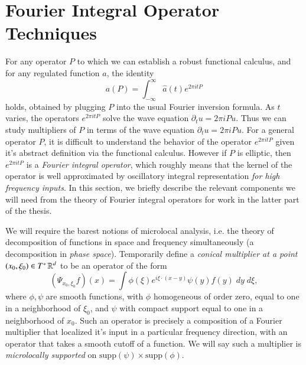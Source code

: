 \section{Fourier Integral Operator Techniques} \label{sec:FourierIntegral}

For any operator $P$ to which we can establish a robust functional calculus, and for any regulated function $a$, the identity
%
\begin{equation}
  a(P) = \int_{-\infty}^\infty \widehat{a}(t) e^{2 \pi itP}
\end{equation}
%
holds, obtained by plugging $P$ into the usual Fourier inversion formula. As $t$ varies, the operators $e^{2 \pi itP}$ solve the wave equation $\partial_t u = 2 \pi i P u$. Thus we can study multipliers of $P$ in terms of the wave equation $\partial_t u = 2 \pi i P u$. For a general operator $P$, it is difficult to understand the behavior of the operator $e^{2 \pi i t P}$ given it's abstract definition via the functional calculus. However if $P$ is elliptic, then $e^{2 \pi i t P}$ is a \emph{Fourier integral operator}, which roughly means that the kernel of the operator is well approximated by oscillatory integral representation \emph{for high frequency inputs}. In this section, we briefly describe the relevant components we will need from the theory of Fourier integral operators for work in the latter part of the thesis.

We will require the barest notions of microlocal analysis, i.e. the theory of decomposition of functions in space and frequency simultaneously (a decomposition in \emph{phase space}). Temporarily define a \emph{conical multiplier at a point $(x_0,\xi_0) \in T^* \operatorname{\mathbb{R}}^d$} to be an operator of the form
%
\begin{equation}
  (\Psi_{x_0,\xi_0} f)(x) = \int \phi( \xi ) e^{i \xi \cdot (x - y)} \psi(y) f(y)\; dy\; d\xi,
\end{equation}
%
where $\phi,\psi$ are smooth functions, with $\phi$ homogeneous of order zero, equal to one in a neighborhood of $\xi_0$, and $\psi$ with compact support equal to one in a neighborhood of $x_0$. Such an operator is precisely a composition of a Fourier multiplier that localized it's input in a particular frequency direction, with an operator that takes a smooth cutoff of a function. We will say such a multiplier is \emph{microlocally supported} on $\text{supp}(\psi) \times \text{supp}(\phi)$.

